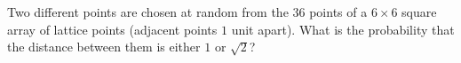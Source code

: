 Two different points are chosen at random from the $36$ points of a $6\times6$ square array of lattice points (adjacent points $1$ unit apart). What is the probability that the distance between them is either $1$ or $\sqrt2$?
